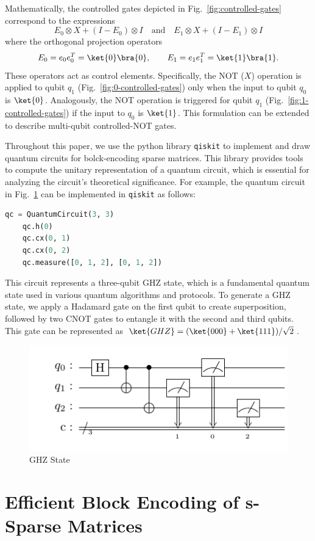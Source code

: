 \documentclass{article}
\begin{document}
Mathematically, the controlled gates depicted in Fig.~\ref{fig:controlled-gates} correspond to the expressions
\begin{equation}
  E_0 \otimes X + (I - E_0) \otimes I \quad \text{and} \quad E_1 \otimes X + (I - E_1) \otimes I
\end{equation}
where the orthogonal projection operators
\begin{equation}
  E_0 = e_0 e_0^T = \ket{0} \bra{0}, \qquad E_1 = e_1 e_1^T = \ket{1}\bra{1}.
\end{equation}
These operators act as control elements.
Specifically, the NOT ($X$) operation is applied to qubit $q_1$ (Fig.~\ref{fig:0-controlled-gates}) only when the input to qubit $q_0$ is $\ket{0}$. Analogously, the NOT operation is triggered for qubit $q_1$ (Fig.~\ref{fig:1-controlled-gates}) if the input to $q_0$ is $\ket{1}$.
This formulation can be extended to describe multi-qubit controlled-NOT gates.

Throughout this paper, we use the python library \texttt{qiskit} \cite{wille2019ibm} to implement and draw quantum circuits for bolck-encoding sparse matrices.
This library provides tools to compute the unitary representation of a quantum circuit, which is essential for analyzing the circuit's theoretical significance.
For example, the quantum circuit in Fig.~\ref{fig:circuit1} can be implemented in \texttt{qiskit} as follows:

    \begin{lstlisting}[language=Python, label={lst:ghz-circuit}]
    qc = QuantumCircuit(3, 3)
    qc.h(0)
    qc.cx(0, 1)
    qc.cx(0, 2)
    qc.measure([0, 1, 2], [0, 1, 2])
    \end{lstlisting}

This circuit represents a three-qubit GHZ state, which is a fundamental quantum state used in various quantum algorithms and protocols.
To generate a GHZ state, we apply a Hadamard gate on the first qubit to create superposition, followed by two CNOT gates to entangle it with the second and third qubits.
This gate can be represented as $\ket{GHZ} = (\ket{000}+\ket{111})/\sqrt{2}$.

\begin{figure}[htbp]
  \centering
  \includegraphics{pdf/example}
  \caption{
    GHZ State
  }
  \label{fig:circuit1}
\end{figure}

\section{Efficient Block Encoding of s-Sparse Matrices}



\end{document}
